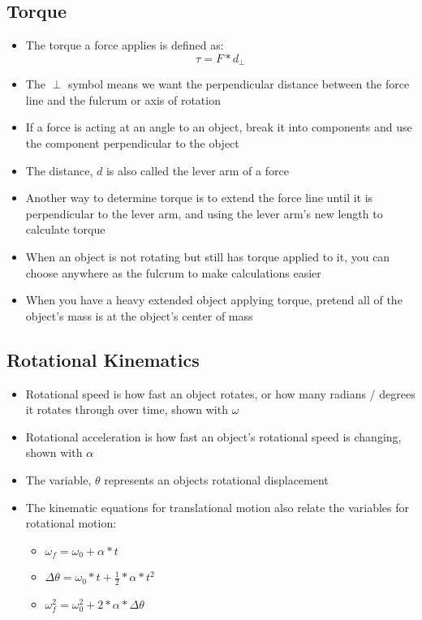 \subsection{Torque}
\begin{itemize}
    \item The torque a force applies is defined as: \[\tau=F*d_{\perp}\]
    \item The \(\perp\) symbol means we want the perpendicular distance between the force line and the fulcrum or axis of rotation
    \item If a force is acting at an angle to an object, break it into components and use the component perpendicular to the object
    \item The distance, \(d\) is also called the lever arm of a force
    \item Another way to determine torque is to extend the force line until it is perpendicular to the lever arm, and using the lever arm's new length to calculate torque
    \item When an object is not rotating but still has torque applied to it, you can choose anywhere as the fulcrum to make calculations easier
    \item When you have a heavy extended object applying torque, pretend all of the object's mass is at the object's center of mass
\end{itemize}

\subsection{Rotational Kinematics}
\begin{itemize}
    \item Rotational speed is how fast an object rotates, or how many radians / degrees it rotates through over time, shown with \(\omega\)
    \item Rotational acceleration is how fast an object's rotational speed is changing, shown with \(\alpha\)
    \item The variable, \(\theta\) represents an objects rotational displacement
    \item The kinematic equations for translational motion also relate the variables for rotational motion:
    \begin{itemize}
        \item \(\omega_f=\omega_0+\alpha*t\)
        \item \(\Delta\theta=\omega_0*t+\frac{1}{2}*\alpha*t^2\)
        \item \(\omega_f^2=\omega_0^2+2*\alpha*\Delta\theta\)
    \end{itemize}
\end{itemize}


